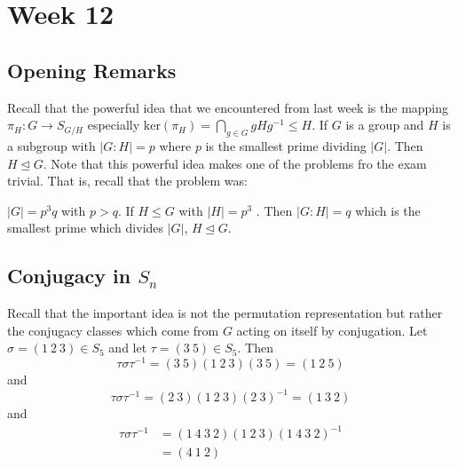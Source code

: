 \section{Week 12}

\subsection{Opening Remarks}

Recall that the powerful idea that we encountered from last week is the mapping \( {\pi}_{H} : G \to {S}_{G/H} \) especially \( \text{ker}({\pi}_{H}) = \bigcap_{  g \in G  }^{  }  g H g^{-1} \leq H  \). If \( G  \) is a group and \( H  \) is a subgroup with \(  | G : H  |  = p  \) where \( p  \) is the smallest prime dividing \( | G  |  \). Then \( H \trianglelefteq G  \). Note that this powerful idea makes one of the problems fro the exam trivial. That is, recall that the problem was:   
\begin{center}
    \( | G  |  = p^{3} q  \) with \( p > q  \). If \( H \leq G  \) with \( |  H  |  = p^{3}   \) . Then \( | G: H  | = q  \) which is the smallest prime which divides \( | G  |  \), \( H \trianglelefteq G  \).
\end{center}

\subsection{Conjugacy in \( {S}_{n} \)}

Recall that the important idea is not the permutation representation but rather the conjugacy classes which come from \( G  \) acting on itself by conjugation. Let \( \sigma = (1 \ 2 \ 3) \in {S}_{5} \) and let \( \tau = (3  \ 5 ) \in {S}_{5} \). Then
\[  \tau \sigma \tau^{-1} = (3 \ 5)(1 \ 2 \ 3)(3 \ 5) = (1 \ 2 \ 5)    \]
and
\[  \tau \sigma \tau^{-1} = (2 \ 3) (1 \ 2 \ 3)(2 \ 3)^{-1} = (1 \ 3 \ 2) \]
and
\begin{align*}
    \tau \sigma \tau^{-1} &= (1 \ 4 \ 3 \ 2) (1 \ 2 \ 3)(1 \ 4 \ 3 \ 2)^{-1} \\
                          &= (4 \ 1 \ 2)
\end{align*}

